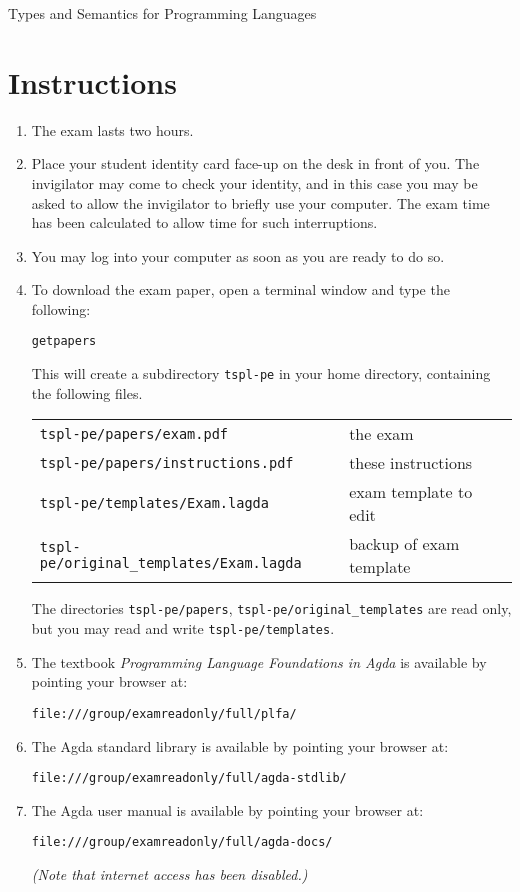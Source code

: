 \documentclass[12pt]{article}
\begin{document}
\pagestyle{empty}
\setcounter{page}{1}

\begin{center}
\large Types and Semantics for Programming Languages
\end{center}

\section*{Instructions}

\begin{enumerate}

\item  The exam lasts two hours.  

\item Place your student identity card face-up on the desk in
  front of you.  The invigilator may come to check your identity, and
  in this case you may be asked to allow the invigilator to briefly
  use your computer.  The exam time has been calculated to allow time
  for such interruptions.

\item You may log into your computer as soon as you are ready to do so.

\item To download the exam paper, open a terminal window and 
type the following:
\begin{center}
   \texttt{getpapers}
\end{center}
This will create a subdirectory \texttt{tspl-pe} in your home directory,
containing the following files.
\begin{center}
\begin{tabular}{ll}
\texttt{tspl-pe/papers/exam.pdf}			& the exam \\
\texttt{tspl-pe/papers/instructions.pdf}		& these instructions \\
\texttt{tspl-pe/templates/Exam.lagda}			& exam template to edit \\
\texttt{tspl-pe/original\_templates/Exam.lagda}		& backup of exam template
\end{tabular}
\end{center}
The directories \texttt{tspl-pe/papers}, \texttt{tspl-pe/original\_templates} are
read only, but you may read and write \texttt{tspl-pe/templates}.

\item The textbook \emph{Programming Language Foundations in Agda} is available
by pointing your browser at:
\begin{center}
\texttt{file:///group/examreadonly/full/plfa/}
\end{center}
\item The Agda standard library is available by pointing your browser at:
\begin{center}
\texttt{file:///group/examreadonly/full/agda-stdlib/}
\end{center}
\item The Agda user manual is available by pointing your browser at:
\begin{center}
\texttt{file:///group/examreadonly/full/agda-docs/}
\end{center}
{\it (Note that internet access has been disabled.)}


\end{enumerate}
\end{document}
